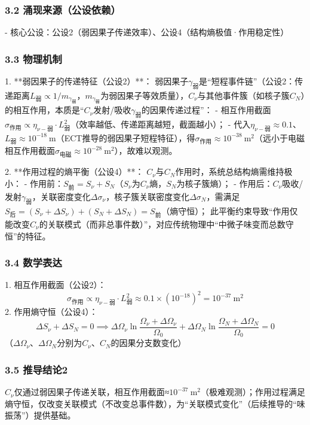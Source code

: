 \documentclass{article}
\begin{document}
\subsubsection{3.2 涌现来源（公设依赖）}
- 核心公设：公设2（弱因果子传递效率）、公设4（结构熵极值·作用稳定性）

\subsubsection{3.3 物理机制}
1. **弱因果子的传递特征（公设2）**：  
   弱因果子\(\gamma_{\text{弱}}\)是“短程事件链”（公设2：传递距离\(L_{\text{弱}} \propto 1/m_{\gamma_{\text{弱}}}\)，\(m_{\gamma_{\text{弱}}}\)为弱因果子等效质量），\(C_{\nu}\)与其他事件簇（如核子簇\(C_N\)）的相互作用，本质是“\(C_{\nu}\)发射/吸收\(\gamma_{\text{弱}}\)的因果传递过程”：  
   - 相互作用截面\(\sigma_{\text{作用}} \propto \eta_{\nu-\text{弱}} \cdot L_{\text{弱}}^2\)（效率越低、传递距离越短，截面越小）；  
   - 代入\(\eta_{\nu-\text{弱}}≈0.1\)、\(L_{\text{弱}}≈10^{-18}\ \text{m}\)（ECT推导的弱因果子短程特征），得\(\sigma_{\text{作用}}≈10^{-38}\ \text{m}^2\)（远小于电磁相互作用截面\(\sigma_{\text{电磁}}≈10^{-28}\ \text{m}^2\)），故难以观测。

2. **作用过程的熵平衡（公设4）**：  
   \(C_{\nu}\)与\(C_N\)作用时，系统总结构熵需维持极小：  
   - 作用前：\(S_{\text{前}} = S_{\nu} + S_N\)（\(S_{\nu}\)为\(C_{\nu}\)熵，\(S_N\)为核子簇熵）；  
   - 作用后：\(C_{\nu}\)吸收/发射\(\gamma_{\text{弱}}\)，关联密度变化\(\Delta\sigma_{\nu}\)，核子簇关联密度变化\(\Delta\sigma_N\)，需满足\(S_{\text{后}} = (S_{\nu} + \Delta S_{\nu}) + (S_N + \Delta S_N) = S_{\text{前}}\)（熵守恒）；  
   此平衡约束导致“作用仅能改变\(C_{\nu}\)的关联模式（而非总事件数）”，对应传统物理中“中微子味变而总数守恒”的特征。

\subsubsection{3.4 数学表达}
1. 相互作用截面（公设2）：  
   \[
   \sigma_{\text{作用}} \propto \eta_{\nu-\text{弱}} \cdot L_{\text{弱}}^2 \approx 0.1 \times (10^{-18})^2 = 10^{-37}\ \text{m}^2
   \]
2. 作用熵守恒（公设4）：  
   \[
   \Delta S_{\nu} + \Delta S_N = 0 \implies \Delta\Omega_{\nu} \ln\frac{\Omega_{\nu}+\Delta\Omega_{\nu}}{\Omega_0} + \Delta\Omega_N \ln\frac{\Omega_N+\Delta\Omega_N}{\Omega_0} = 0
   \]
   （\(\Delta\Omega_{\nu}\)、\(\Delta\Omega_N\)分别为\(C_{\nu}\)、\(C_N\)的因果分支数变化）

\subsubsection{3.5 推导结论2}
\(C_{\nu}\)仅通过弱因果子传递关联，相互作用截面≈\(10^{-37}\ \text{m}^2\)（极难观测）；作用过程满足熵守恒，仅改变关联模式（不改变总事件数），为“关联模式变化”（后续推导的“味振荡”）提供基础。
\end{document}
